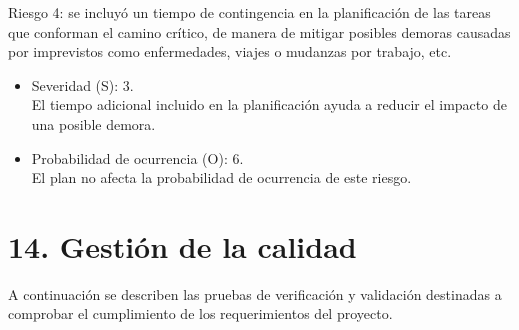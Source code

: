 \documentclass[
11pt, %
]{charter}
\begin{document}
Riesgo 4: se incluyó un tiempo de contingencia en la planificación de las tareas que conforman el camino crítico, de manera de mitigar posibles demoras causadas por imprevistos como enfermedades, viajes o mudanzas por trabajo, etc.
\begin{itemize}
	\item Severidad (S): 3. \\
	El tiempo adicional incluido en la planificación ayuda a reducir el impacto de una posible demora.
	\item Probabilidad de ocurrencia (O): 6.\\
	El plan no afecta la probabilidad de ocurrencia de este riesgo.
\end{itemize}   

\pagebreak

\section{14. Gestión de la calidad}
\label{sec:calidad}

A continuación se describen las pruebas de verificación y validación destinadas a comprobar el cumplimiento de los requerimientos del proyecto.
\end{document}
